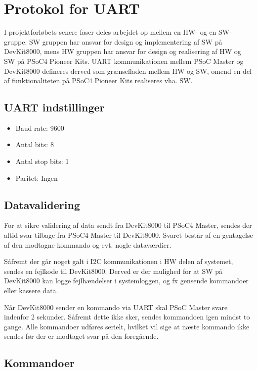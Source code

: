 \section{Protokol for UART} \label{sec:UART_protokol}

I projektforløbets senere faser deles arbejdet op mellem en HW- og en SW-gruppe. 
SW gruppen har ansvar for design og implementering af SW på DevKit8000, mens HW gruppen har ansvar for design og realisering af HW og SW på PSoC4 Pioneer Kits. 
UART kommunikationen mellem PSoC Master og DevKit8000 defineres derved som grænsefladen mellem HW og SW, omend en del af funktionaliteten på PSoC4 Pioneer Kits realiseres vha. SW.

\subsection{UART indstillinger}

\begin{itemize}
\item Baud rate: 9600 
\item Antal bits: 8
\item Antal stop bits: 1
\item Paritet: Ingen
\end{itemize}

\subsection{Datavalidering}

For at sikre validering af data sendt fra DevKit8000 til PSoC4 Master, sendes der altid svar tilbage fra PSoC4 Master til DevKit8000. 
Svaret består af en gentagelse af den modtagne kommando og evt. nogle dataværdier. 

Såfremt der går noget galt i I2C kommunikationen i HW delen af systemet, sendes en fejlkode til DevKit8000. 
Derved er der mulighed for at SW på DevKit8000 kan logge fejlhændelser i systemloggen, og fx gensende kommandoer eller kassere data. 

Når DevKit8000 sender en kommando via UART skal PSoC Master svare indenfor 2 sekunder. 
Såfremt dette ikke sker, sendes kommandoen igen mindst to gange. 
Alle kommandoer udføres serielt, hvilket vil sige at næste kommando ikke sendes før der er modtaget svar på den foregående.

\clearpage

\subsection{Kommandoer}


\vfill